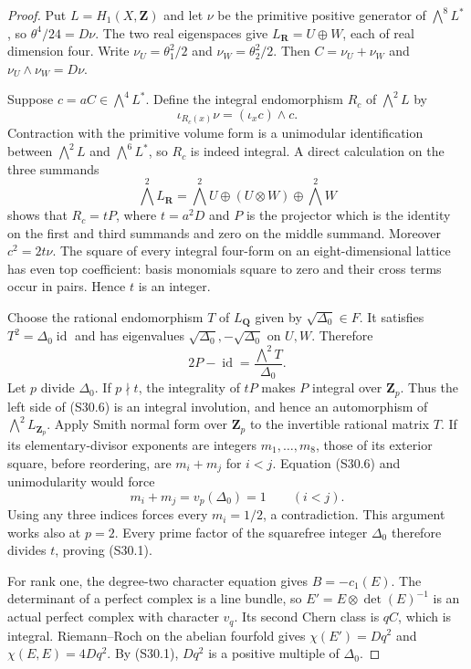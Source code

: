 \documentclass[11pt,a4paper]{article}
\theoremstyle{definition}
\begin{document}
\begin{proof}
Put $L=H_1(X,\mathbf Z)$ and let $\nu$ be the primitive
positive generator of $\bigwedge^8L^*$, so
$\theta^4/24=D\nu$. The two real eigenspaces give
$L_{\mathbf R}=U\oplus W$, each of real dimension four.
Write $\nu_U=\theta_1^2/2$ and $\nu_W=\theta_2^2/2$.
Then $C=\nu_U+\nu_W$ and $\nu_U\wedge\nu_W=D\nu$.

Suppose $c=aC\in\bigwedge^4L^*$. Define the integral
endomorphism $R_c$ of $\bigwedge^2L$ by
\[
 \iota_{R_c(x)}\nu=(\iota_xc)\wedge c.
 \tag{S30.5}
\]
Contraction with the primitive volume form is a
unimodular identification between
$\bigwedge^2L$ and $\bigwedge^6L^*$, so $R_c$ is indeed
integral. A direct calculation on the three summands
\[
 \bigwedge^2L_{\mathbf R}
  =\bigwedge^2U\oplus(U\otimes W)\oplus\bigwedge^2W
\]
shows that $R_c=tP$, where $t=a^2D$ and $P$ is the
projector which is the identity on the first and third
summands and zero on the middle summand.
Moreover $c^2=2t\nu$. The square of every integral
four-form on an eight-dimensional lattice has even top
coefficient: basis monomials square to zero and their
cross terms occur in pairs. Hence $t$ is an integer.

Choose the rational endomorphism $T$ of $L_{\mathbf Q}$
given by $\sqrt{\Delta_0}\in F$. It satisfies
$T^2=\Delta_0\operatorname{id}$ and has eigenvalues
$\sqrt{\Delta_0},-\sqrt{\Delta_0}$ on $U,W$. Therefore
\[
 2P-\operatorname{id}
      =\frac{\bigwedge^2T}{\Delta_0}.
 \tag{S30.6}
\]
Let $p$ divide $\Delta_0$. If $p\nmid t$, the integrality
of $tP$ makes $P$ integral over $\mathbf Z_p$.
Thus the left side of (S30.6) is an integral involution,
and hence an automorphism of $\bigwedge^2L_{\mathbf Z_p}$.
Apply Smith normal form over $\mathbf Z_p$ to the
invertible rational matrix $T$. If its elementary-divisor
exponents are integers $m_1,\ldots,m_8$, those of its
exterior square, before reordering, are
$m_i+m_j$ for $i<j$. Equation (S30.6) and unimodularity
would force
\[
 m_i+m_j=v_p(\Delta_0)=1\qquad(i<j).
 \tag{S30.7}
\]
Using any three indices forces every $m_i=1/2$, a
contradiction. This argument works also at $p=2$.
Every prime factor of the squarefree integer $\Delta_0$
therefore divides $t$, proving (S30.1).

For rank one, the degree-two character equation gives
$B=-c_1(E)$. The determinant of a perfect complex is a
line bundle, so $E'=E\otimes\det(E)^{-1}$ is an actual
perfect complex with character $v_q$. Its second Chern
class is $qC$, which is integral. Riemann--Roch on the
abelian fourfold gives $\chi(E')=Dq^2$ and
$\chi(E,E)=4Dq^2$. By (S30.1), $Dq^2$ is a positive
multiple of $\Delta_0$.


\end{proof}
\end{document}

